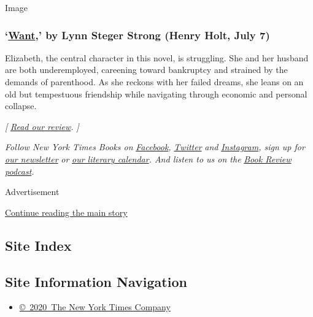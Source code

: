 Image

\hypertarget{want-by-lynn-steger-strong-henry-holt-july-7}{%
\subsubsection{\texorpdfstring{`\href{https://us.macmillan.com/books/9781250247537}{Want},'
by Lynn Steger Strong (Henry Holt, July
7)}{`Want,' by Lynn Steger Strong (Henry Holt, July 7)}}\label{want-by-lynn-steger-strong-henry-holt-july-7}}

Elizabeth, the central character in this novel, is struggling. She and
her husband are both underemployed, careening toward bankruptcy and
strained by the demands of parenthood. As she reckons with her failed
dreams, she leans on an old but tempestuous friendship while navigating
through economic and personal collapse.

\emph{{[}}
\href{https://www.nytimes3xbfgragh.onion/2020/07/07/books/review/want-lynn-steger-strong.html}{\emph{Read
our review}}\emph{. {]}}

\emph{Follow New York Times Books on}
\href{https://www.facebookcorewwwi.onion/nytbooks/}{\emph{Facebook}}\emph{,}
\href{https://twitter.com/nytimesbooks}{\emph{Twitter}} \emph{and}
\href{https://www.instagram.com/nytbooks/}{\emph{Instagram}}\emph{, sign
up for}
\href{https://www.nytimes3xbfgragh.onion/newsletters/books-review}{\emph{our
newsletter}} \emph{or}
\href{https://www.nytimes3xbfgragh.onion/interactive/2017/books/books-calendar.html}{\emph{our
literary calendar}}\emph{. And listen to us on the}
\href{https://www.nytimes3xbfgragh.onion/column/book-review-podcast}{\emph{Book
Review podcast}}\emph{.}

Advertisement

\protect\hyperlink{after-bottom}{Continue reading the main story}

\hypertarget{site-index}{%
\subsection{Site Index}\label{site-index}}

\hypertarget{site-information-navigation}{%
\subsection{Site Information
Navigation}\label{site-information-navigation}}

\begin{itemize}
\tightlist
\item
  \href{https://help.nytimes3xbfgragh.onion/hc/en-us/articles/115014792127-Copyright-notice}{©~2020~The
  New York Times Company}
\end{itemize}

